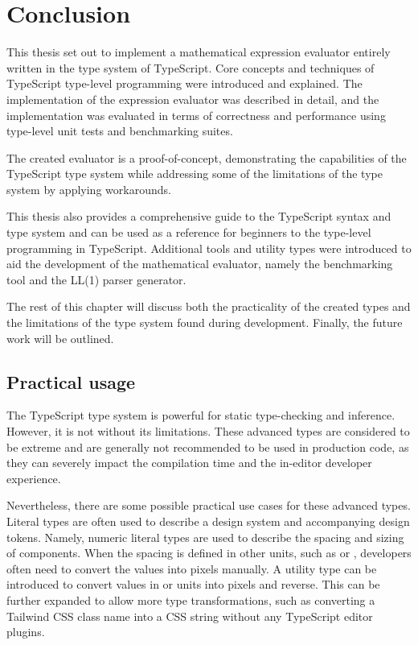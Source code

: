 \chapter{Conclusion}

This thesis set out to implement a mathematical expression evaluator entirely written in the type system of TypeScript. Core concepts and techniques of TypeScript type-level programming were introduced and explained. The implementation of the expression evaluator was described in detail, and the implementation was evaluated in terms of correctness and performance using type-level unit tests and benchmarking suites.

The created evaluator is a proof-of-concept, demonstrating the capabilities of the TypeScript type system while addressing some of the limitations of the type system by applying workarounds.

This thesis also provides a comprehensive guide to the TypeScript syntax and type system and can be used as a reference for beginners to the type-level programming in TypeScript. Additional tools and utility types were introduced to aid the development of the mathematical evaluator, namely the benchmarking tool and the LL(1) parser generator.

The rest of this chapter will discuss both the practicality of the created types and the limitations of the type system found during development. Finally, the future work will be outlined.

\section{Practical usage}

The TypeScript type system is powerful for static type-checking and inference. However, it is not without its limitations. These advanced types are considered to be extreme and are generally not recommended to be used in production code, as they can severely impact the compilation time and the in-editor developer experience.

Nevertheless, there are some possible practical use cases for these advanced types. Literal types are often used to describe a design system and accompanying design tokens. Namely, numeric literal types are used to describe the spacing and sizing of components. When the spacing is defined in other units, such as  or , developers often need to convert the values into pixels manually. A utility type can be introduced to convert values in  or  units into pixels and reverse. This can be further expanded to allow more type transformations, such as converting a Tailwind CSS class name into a CSS string without any TypeScript editor plugins.

